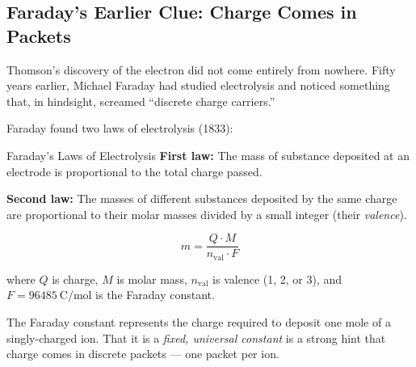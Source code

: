 \documentclass[12pt, a4paper]{book}
\theoremstyle{definition}
\begin{document}
\subsection{Faraday's Earlier Clue: Charge Comes in Packets}

Thomson's discovery of the electron did not come entirely
from nowhere.
Fifty years earlier, Michael Faraday had studied electrolysis
and noticed something that, in hindsight, screamed
``discrete charge carriers.''

Faraday found two laws of electrolysis (1833):

\begin{namedconcept}{Faraday's Laws of Electrolysis}
\textbf{First law:} The mass of substance deposited at an electrode
is proportional to the total charge passed.

\textbf{Second law:} The masses of different substances deposited
by the same charge are proportional to their
molar masses divided by a small integer
(their \emph{valence}).

\[
  m = \frac{Q \cdot M}{n_{\text{val}} \cdot F}
\]

where $Q$ is charge, $M$ is molar mass,
$n_{\text{val}}$ is valence (1, 2, or 3),
and $F = \SI{96485}{\coulomb\per\mol}$ is the Faraday constant.
\end{namedconcept}

\vspace{0.5em}

The Faraday constant represents the charge required to deposit
one mole of a singly-charged ion.
That it is a \emph{fixed, universal constant} is a strong
hint that charge comes in discrete packets ---
one packet per ion.
\end{document}
